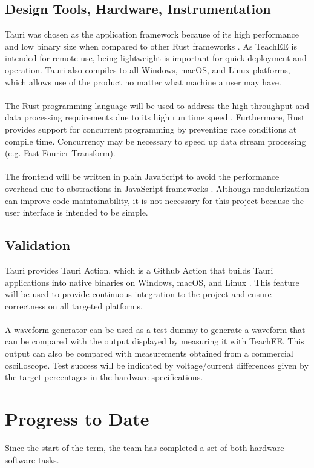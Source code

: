 \documentclass[letterpaper,12pt]{article}
\begin{document}
\subsection{Design Tools, Hardware, Instrumentation}
Tauri was chosen as the application framework because of its high performance
and low binary size when compared to other Rust frameworks 
\cite{tauri_benchmarks}. As TeachEE is intended for remote use, being
lightweight is important for quick deployment and operation. Tauri also compiles
to all Windows, macOS, and Linux platforms, which allows use of the product no
matter what machine a user may have.
\\~\\
The Rust programming language will be used to address the high throughput and
data processing requirements due to its high run time speed \cite{rust_speed}.
Furthermore, Rust provides support for concurrent programming by preventing race
conditions at compile time. Concurrency may be necessary to speed up data stream
processing (e.g. Fast Fourier Transform).
\\~\\
The frontend will be written in plain JavaScript to avoid the performance
overhead due to abstractions in JavaScript frameworks \cite{javascript_speed}.
Although modularization can improve code maintainability, it is not necessary
for this project because the user interface is intended to be simple.

\subsection{Validation}
Tauri provides Tauri Action, which is a Github Action that builds Tauri
applications into native binaries on Windows, macOS, and Linux
\cite{tauri_actions}. This feature will be used to provide continuous integration
to the project and ensure correctness on all targeted platforms.
\\~\\
A waveform generator can be used as a test dummy to generate a waveform that
can be compared with the output displayed by measuring it with TeachEE.
This output can also be compared with measurements obtained from a commercial
oscilloscope. Test success will be indicated by voltage/current differences
given by the target percentages in the hardware specifications.

\section{Progress to Date} %
Since the start of the term, the team has completed a set of both hardware
software tasks.
\end{document}
